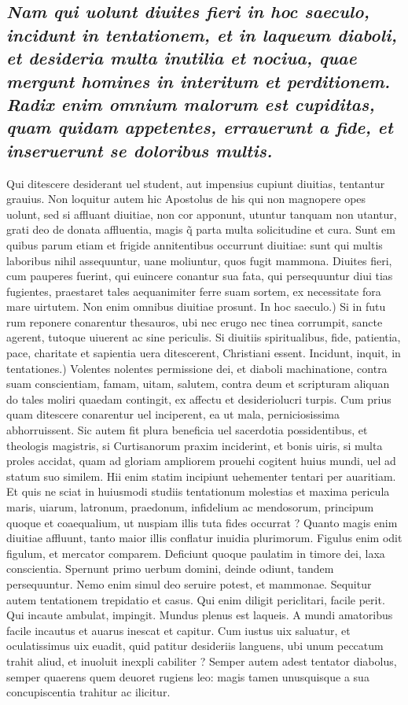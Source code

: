 \documentclass{article}
\begin{document}
\begin{pages}
\subsection*{\textit{Nam qui uolunt diuites fieri in hoc saeculo, incidunt in tentationem, et in laqueum diaboli, et desideria multa inutilia et nociua, quae mergunt homines in interitum et perditionem. Radix enim omnium malorum est cupiditas, quam quidam appetentes, errauerunt a fide, et inseruerunt se doloribus multis. }}\pstart Qui ditescere desiderant uel student, aut impensius cupiunt diuitias, tentantur grauius. Non loquitur autem hic Apostolus de his qui non magnopere opes uolunt, sed si affluant diuitiae, non cor apponunt, utuntur tanquam non utantur, grati deo de donata affluentia, magis q̃ parta multa solicitudine et cura. Sunt em quibus parum etiam et frigide annitentibus occurrunt diuitiae: sunt qui multis laboribus nihil assequuntur, uane moliuntur, quos fugit mammona. Diuites fieri, cum pauperes fuerint, qui euincere conantur sua fata, qui persequuntur diui tias fugientes, praestaret tales aequanimiter ferre suam sortem, ex necessitate fora mare uirtutem. Non enim omnibus diuitiae prosunt. In hoc saeculo.) Si in futu rum reponere conarentur thesauros, ubi nec erugo nec tinea corrumpit, sancte agerent, tutoque uiuerent ac sine periculis. Si diuitiis spiritualibus, fide, patientia, pace, charitate et sapientia uera ditescerent, Christiani essent. Incidunt, inquit, in tentationes.) Volentes nolentes permissione dei, et diaboli machinatione, contra suam conscientiam, famam, uitam, salutem, contra deum et scripturam aliquan do tales moliri quaedam contingit, ex affectu et desideriolucri turpis. Cum prius quam ditescere conarentur uel inciperent, ea ut mala, perniciosissima abhorruissent. Sic autem fit plura beneficia uel sacerdotia possidentibus, et theologis magistris, si Curtisanorum praxim inciderint, et bonis uiris, si multa proles accidat, quam ad gloriam ampliorem prouehi cogitent huius mundi, uel ad statum suo similem. Hii enim statim incipiunt uehementer tentari per auaritiam. Et quis ne sciat in huiusmodi studiis tentationum molestias et maxima pericula maris, uiarum, latronum, praedonum, infidelium ac mendosorum, principum quoque et coaequalium, ut nuspiam illis tuta fides occurrat ? Quanto magis enim diuitiae affluunt, tanto maior illis conflatur inuidia plurimorum. Figulus enim odit figulum, et mercator comparem. Deficiunt quoque paulatim in timore dei, laxa conscientia. Spernunt primo uerbum domini, deinde odiunt, tandem persequuntur. Nemo enim simul deo seruire potest, et mammonae. Sequitur autem tentationem trepidatio et casus. Qui enim diligit periclitari, facile perit. Qui incaute ambulat, impingit. Mundus plenus est laqueis. A mundi amatoribus facile incautus et auarus inescat et capitur. Cum iustus uix saluatur, et oculatissimus uix euadit, quid patitur desideriis languens, ubi unum peccatum trahit aliud, et inuoluit inexpli cabiliter ? Semper autem adest tentator diabolus, semper quaerens quem deuoret rugiens leo: magis tamen unusquisque a sua concupiscentia trahitur ac ilicitur.  \pend

\end{pages}
\end{document}
